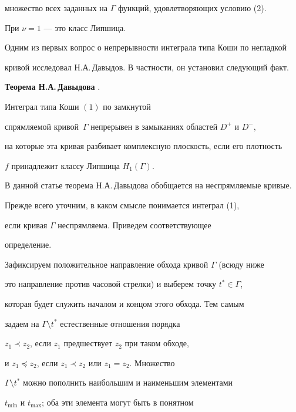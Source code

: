 множество всех заданных на $\Gamma$ функций, удовлетворяющих условию (2).


При $\nu = 1$ --- это класс Липшица.





Одним из первых вопрос о непрерывности интеграла типа Коши по негладкой


кривой исследовал Н.А.\,Давыдов. В частности, он установил следующий факт.


\medskip





{\bf Теорема Н.А.\,Давыдова} \cite{D}. {\it


Интеграл типа Коши $(1)$ по замкнутой


спрямляемой кривой~$\Gamma$ непрерывен в замыканиях областей $D^+$ и $D^-$,


на которые эта кривая разбивает комплексную плоскость, если его плотность


$f$ принадлежит классу Липшица $H_{1}(\Gamma)$.


}


\medskip





В данной статье теорема Н.А.\,Давыдова обобщается на неспрямляемые кривые.


Прежде всего уточним, в каком смысле понимается интеграл (1),


если кривая $\Gamma$ неспрямляема. Приведем соответствующее


определение.





Зафиксируем положительное направление обхода кривой $\Gamma$ (всюду ниже


это направление против часовой стрелки) и выберем точку $t^*\in\Gamma$,


которая будет служить началом и концом этого обхода. Тем самым


задаем на $\Gamma\setminus t^*$ естественные отношения порядка


$z_1\prec z_2$, если $z_1$ предшествует $z_2$ при таком обходе,


и $z_1\preceq z_2$, если $z_1 \prec z_2$ или $z_1 = z_2$. Множество


$\Gamma\setminus t^*$ можно пополнить наибольшим и наименьшим элементами


$t_{\min}$ и $t_{\max}$; оба эти элемента могут быть в понятном


